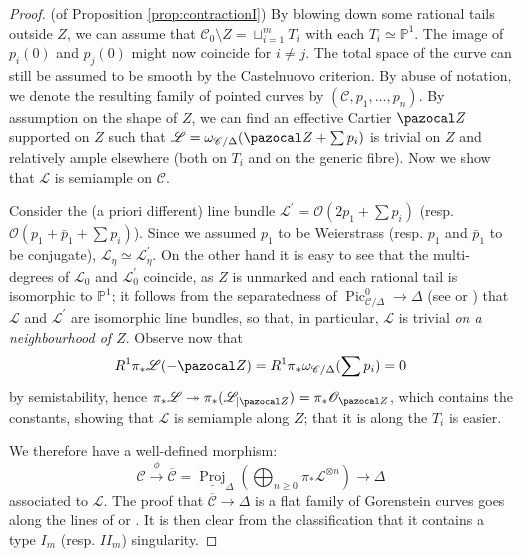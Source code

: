 \documentclass{compositio}
\newcommand{\PP}{\mathbb P}
\newcommand{\OO}{\mathcal O}
\renewcommand{\to}{\rightarrow}
\newcommand{\dvr}{\Delta}
\newcommand{\Pic}{\operatorname{Pic}}
\theoremstyle{plain}
\theoremstyle{definition}
\theoremstyle{remark}
\begin{document}
\begin{proof}(of Proposition \ref{prop:contractionI})
 By blowing down some rational tails outside $Z$, we can assume that $\mathcal C_0\setminus Z=\sqcup_{i=1}^m T_i$ with each $T_i\simeq\PP^1$. The image of $p_i(0)$ and $p_j(0)$ might now coincide for $i\neq j$. The total space of the curve can still be assumed to be smooth by the Castelnuovo criterion. By abuse of notation, we denote the resulting family of pointed curves by $(\mathcal C,p_1,\ldots,p_n)$. By assumption on the shape of $Z$, we can find an effective Cartier $\pazocal Z$ supported on $Z$ such that $\mathcal L=\omega_{\mathcal C/\dvr}(\pazocal Z+\sum p_i)$ is trivial on $Z$ and relatively ample elsewhere (both on $T_i$ and on the generic fibre). Now we show that $\mathcal L$ is semiample on $\mathcal C$.
 
 Consider the (a priori different) line bundle $\mathcal L^\prime=\OO(2p_1+\sum p_i)$ (resp. $\OO(p_1+\bar p_1+\sum p_i)$). Since we assumed $p_1$ to be Weierstrass (resp. $p_1$ and $\bar p_1$ to be conjugate), $\mathcal L_\eta\simeq\mathcal L^\prime_\eta$. On the other hand it is easy to see that the multi-degrees of $\mathcal L_0$ and $\mathcal L^\prime_0$ coincide, as $Z$ is unmarked and each rational tail is isomorphic to $\PP^1$; it follows from the separatedness of $\Pic^0_{\mathcal C/\dvr}\to\dvr$ (see \cite[p. 136]{Deligne-Gabber} or \cite[\S 9.4]{BLR}) that $\mathcal L$ and $\mathcal L^\prime$ are isomorphic line bundles, so that, in particular, $\mathcal L$ is trivial \emph{on a neighbourhood of $Z$}. Observe now that 
 \[R^1\pi_*\mathcal L(-{\pazocal Z})= R^1\pi_*\omega_{\mathcal C/\dvr}(\sum p_i)=0\]
 by semistability, hence $\pi_*\mathcal L\twoheadrightarrow \pi_*(\mathcal L_{|{\pazocal Z}})=\pi_*\OO_{\pazocal Z}$, which contains the constants, showing that $\mathcal L$ is semiample along $Z$; that it is along the $T_i$ is easier.
 
 We therefore have a well-defined  morphism:
 \[\mathcal C\xrightarrow{\phi}\overline{\mathcal C}=\underline{\operatorname{Proj}}_\dvr\left(\bigoplus_{n\geq 0}\pi_*\mathcal L^{\otimes n}\right)\to\dvr\]
 associated to $\mathcal L$. The proof that $\overline{\mathcal C}\to \dvr$ is a flat family of Gorenstein curves goes along the lines of \cite[Lemma 2.13]{SMY1} or \cite[Proposition 3.7.3.1]{RSPW1}. It is then clear from the classification that it contains a type $I_m$ (resp. $I\!I_m$) singularity.
 
\end{proof}
\end{document}
